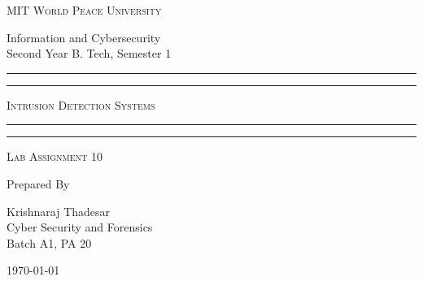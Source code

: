 \documentclass[11pt]{article}
\begin{document}
\begin{titlepage}
    \centering


    \huge\textsc{
        MIT World Peace University
    }\\

    \vspace{0.75\baselineskip} %

    \LARGE{
        Information and Cybersecurity\\
        Second Year B. Tech, Semester 1
    }

    \vfill %


    \rule{\textwidth}{1.6pt}\vspace*{-\baselineskip}\vspace*{2pt}
    \rule{\textwidth}{0.6pt}
    \vspace{0.75\baselineskip} %



    \huge{\textsc{
            Intrusion Detection Systems
        }} \\



    \vspace{0.5\baselineskip} %
    \rule{\textwidth}{0.6pt}\vspace*{-\baselineskip}\vspace*{2.8pt}
    \rule{\textwidth}{1.6pt}

    \vspace{1\baselineskip} %


    \LARGE\textsc{
        Lab Assignment 10
    } %
    \vfill


    Prepared By
    \vspace{0.5\baselineskip} %

    \Large{
        Krishnaraj Thadesar \\
        Cyber Security and Forensics\\
        Batch A1, PA 20
    }


    \vspace{0.5\baselineskip} %
    \today

\end{titlepage}
\end{document}
